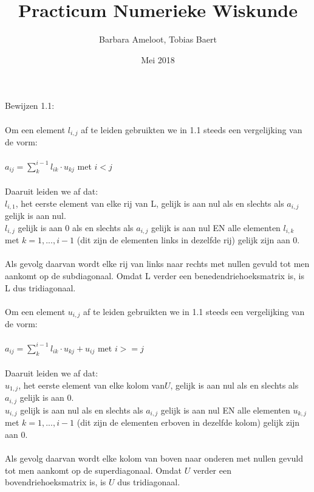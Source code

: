 \documentclass[a4paper]{article}
\title{Practicum Numerieke Wiskunde}
\author{Barbara Ameloot, Tobias Baert}
\date{Mei 2018}
\begin{document}
\maketitle
Bewijzen 1.1:
\\{}
\\Om een element  $l_{i,j}$ af te leiden gebruikten we in 1.1 steeds een vergelijking van de vorm:
\\{}
\\$a_{ij} = \sum_k^{i-1} {l_{ik}\cdot u_{kj}}$ met $ i < j$ 
\\{}
\\Daaruit leiden we af dat:
\\ \textbullet{ } $l_{i,1}$, het eerste element van elke rij van L, gelijk is aan nul als en slechts als $a_{i,j}$ gelijk is aan nul.
\\ \textbullet { } $ l_{i,j}$ gelijk is aan 0 als en slechts als $a_{i,j}$ gelijk is aan nul EN alle elementen $l_{i,k}$ met $k = 1, ..., i - 1$ (dit zijn de elementen links in dezelfde rij) gelijk zijn aan 0.
\\{}
\\Als gevolg daarvan wordt elke rij van links naar rechts met nullen gevuld tot men aankomt op de subdiagonaal. Omdat L verder een benedendriehoeksmatrix is, is L dus tridiagonaal.
\\{}
\\Om een element $u_{i,j}$ af te leiden gebruikten we in 1.1 steeds een vergelijking van de vorm:
\\{}
\\$a_{ij} = \sum_k^{i-1} {l_{ik}\cdot u_{kj}} + u_{ij}$ met $ i >= j $
\\{}
\\Daaruit leiden we af dat:
\\ \textbullet{ } $u_{1,j}$, het eerste element van elke kolom van$ U$, gelijk is aan nul als en slechts als $a_{i,j}$ gelijk is aan 0.
\\ \textbullet{ } $u_{i,j}$ gelijk is aan nul als en slechts als $a_{i,j}$ gelijk is aan nul EN alle elementen $u_{k,j}$ met $k = 1, ..., i - 1$ (dit zijn de elementen erboven in dezelfde kolom) gelijk zijn aan 0.
\\{}
\\Als gevolg daarvan wordt elke kolom van boven naar onderen met nullen gevuld tot men aankomt op de superdiagonaal. Omdat $U$ verder een bovendriehoeksmatrix is, is $U$ dus tridiagonaal.
\end{document}
